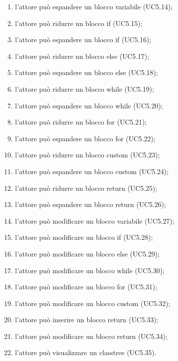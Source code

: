 \begin{itemize}
\begin{enumerate}
		\item l'attore può espandere un blocco variabile (UC5.14);
		\item l'attore può ridurre un blocco if (UC5.15);
		\item l'attore può espandere un blocco if (UC5.16);
		\item l'attore può ridurre un blocco else (UC5.17);
		\item l'attore può espandere un blocco else (UC5.18);
		\item l'attore può ridurre un blocco while (UC5.19);
		\item l'attore può espandere un blocco while (UC5.20);
		\item l'attore può ridurre un blocco for (UC5.21);
		\item l'attore può espandere un blocco for (UC5.22);
		\item l'attore può ridurre un blocco custom (UC5.23);
		\item l'attore può espandere un blocco custom (UC5.24);
		\item l'attore può ridurre un blocco return (UC5.25);
		\item l'attore può espandere un blocco return (UC5.26);
		\item l'attore può modificare un blocco variabile (UC5.27);
		\item l'attore può modificare un blocco if (UC5.28);
		\item l'attore può modificare un blocco else (UC5.29);
		\item l'attore può modificare un blocco while (UC5.30);
		\item l'attore può modificare un blocco for (UC5.31);
		\item l'attore può modificare un blocco custom (UC5.32);
		\item l'attore può inserire un blocco return (UC5.33);
		\item l'attore può modificare un blocco return (UC5.34);
		\item l'attore può visualizzare un classtree (UC5.35).
	\end{enumerate}
\end{itemize}

